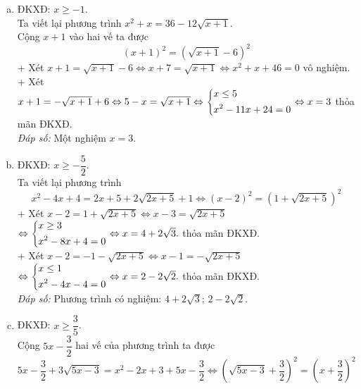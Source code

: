 \begin{bt}
{\begin{enumerate}[a)]
     		$\Leftrightarrow \heva{& x\ge -1\\ & x^2+x=0} \Leftrightarrow \hoac {& x=0\\& x=-1}$ thỏa mãn ĐKXĐ.\\
     		+ Xét $x+\dfrac{1}{2}=\dfrac{1}{2}-\sqrt{x+1}\Leftrightarrow x=-\sqrt{x+1}$ \\
     		$\Leftrightarrow \heva{& x\le 0 \\ & x^2-x-1=0} \Leftrightarrow x=\dfrac{1-\sqrt{5}}{2}$ thỏa mãn ĐKXĐ.\\            
     		\textit{Đáp số:} Phương trình có  nghiệm  $0;-1$ ; $\dfrac{1-\sqrt{5}}{2}$.
     		\item ĐKXĐ: $x\geq -1$.\\
     		Ta viết lại phương trình $x^2+x=36-12\sqrt{x+1}$.\\
     		Cộng $x+1$ vào hai vế ta được
     		$${\left(x+1\right)}^2={\left(\sqrt{x+1}-6\right)}^2$$
     		+ Xét $x+1=\sqrt{x+1}-6\Leftrightarrow x+7=\sqrt{x+1}\Leftrightarrow x^2+x+46=0$ vô nghiệm.\\
     		+ Xét $x+1=-\sqrt{x+1}+6\Leftrightarrow 5-x=\sqrt{x+1}\Leftrightarrow \left\{\begin{aligned}& x\le 5\\ &  x^2-11x+24=0\end{aligned}\right. \Leftrightarrow x=3$  thỏa mãn ĐKXĐ.\\   
     		\textit{Đáp số:} Một nghiệm $x=3$.
     		\item ĐKXĐ: $x\geq-\dfrac{5}{2}$. \\
     		Ta viết lại phương trình 
     		$$x^2-4x+4=2x+5 +2\sqrt{2x+5}+1
     		\Leftrightarrow   {\left(x-2\right)}^2 ={\left(1+\sqrt{2x+5} \right)}^2$$
     		+ Xét $x-2=1+\sqrt{2x+5}\Leftrightarrow x-3=\sqrt{2x+5}$ \\
     		$\Leftrightarrow \left\{\begin{aligned}& x\ge 3\\ & x^2-8x+4=0\end{aligned}\right. \Leftrightarrow x=4+2\sqrt{3}.$ thỏa mãn ĐKXĐ.\\
     		+ Xét $x-2=-1-\sqrt{2x+5}\Leftrightarrow x-1=-\sqrt{2x+5}$ \\
     		$\Leftrightarrow \left\{\begin{aligned}& x\le 1\\ & x^2-4x-4=0\end{aligned}\right. \Leftrightarrow x=2-2\sqrt{2}.$ thỏa mãn ĐKXĐ.\\
     		\textit{Đáp số:} Phương trình có  nghiệm: $4+2\sqrt{3}$; $2-2\sqrt{2}$.
     		\item ĐKXĐ: $x\geq \dfrac{3}{5}$. \\
     		Cộng $5x-\dfrac{3}{2}$ hai vế  của phương trình ta  được
     		$$5x-\dfrac{3}{2}+3\sqrt{5x-3} =x^2-2x+3+5x-\dfrac{3}{2}
     		\Leftrightarrow {\left(\sqrt{5x-3}+\dfrac{3}{2}\right)}^2 = {\left(x+\dfrac{3}{2}\right)}^2$$

\end{enumerate}}
\end{bt}
